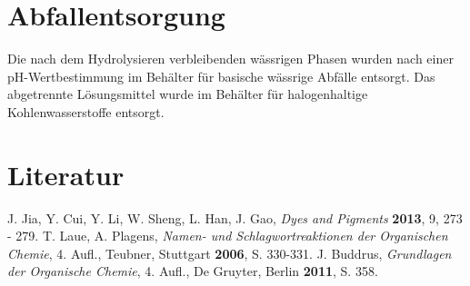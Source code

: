 \documentclass[12pt]{article}
\begin{document}
\begin{onehalfspace}
\section{Abfallentsorgung}
Die nach dem Hydrolysieren verbleibenden wässrigen Phasen wurden
nach einer pH-Wertbestimmung im Behälter für basische wässrige Abfälle entsorgt.
Das abgetrennte Lösungsmittel wurde im Behälter für halogenhaltige Kohlenwasserstoffe entsorgt.
\section{Literatur}
\renewcommand{\section}[2]{}%
\begin{thebibliography}{}
J. Jia, Y. Cui, Y. Li, W. Sheng, L. Han, J. Gao, \textit{Dyes and Pigments} \textbf{2013}, 9, 273 - 279.
T. Laue, A. Plagens, \textit{Namen- und Schlagwortreaktionen der Organischen Chemie}, 4. Aufl., Teubner, Stuttgart \textbf{2006}, S. 330-331.
J. Buddrus, \textit{Grundlagen der Organische Chemie}, 4. Aufl., De Gruyter, Berlin \textbf{2011}, S. 358.
\end{thebibliography}
\end{onehalfspace}
\end{document}
